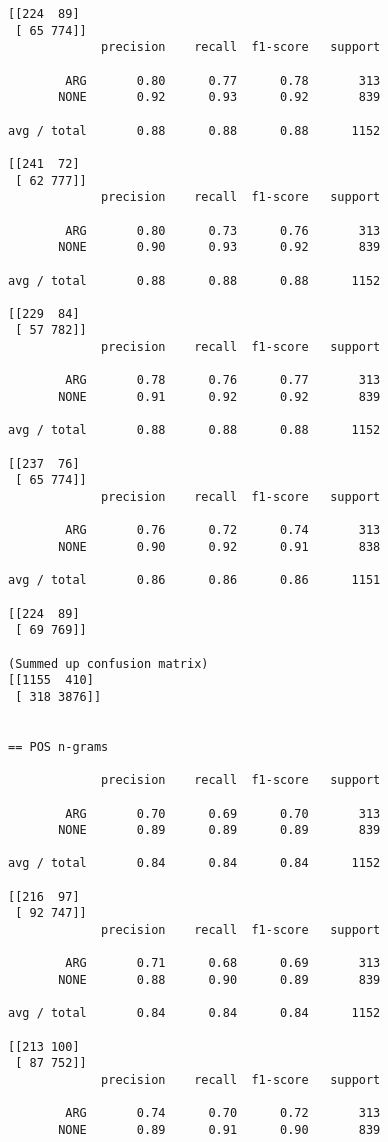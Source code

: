 \begin{appendices}
\begin{verbatim}
[[224  89]
 [ 65 774]]
             precision    recall  f1-score   support

        ARG       0.80      0.77      0.78       313
       NONE       0.92      0.93      0.92       839

avg / total       0.88      0.88      0.88      1152

[[241  72]
 [ 62 777]]
             precision    recall  f1-score   support

        ARG       0.80      0.73      0.76       313
       NONE       0.90      0.93      0.92       839

avg / total       0.88      0.88      0.88      1152

[[229  84]
 [ 57 782]]
             precision    recall  f1-score   support

        ARG       0.78      0.76      0.77       313
       NONE       0.91      0.92      0.92       839

avg / total       0.88      0.88      0.88      1152

[[237  76]
 [ 65 774]]
             precision    recall  f1-score   support

        ARG       0.76      0.72      0.74       313
       NONE       0.90      0.92      0.91       838

avg / total       0.86      0.86      0.86      1151

[[224  89]
 [ 69 769]]
 
(Summed up confusion matrix)
[[1155  410]
 [ 318 3876]]


== POS n-grams

             precision    recall  f1-score   support

        ARG       0.70      0.69      0.70       313
       NONE       0.89      0.89      0.89       839

avg / total       0.84      0.84      0.84      1152

[[216  97]
 [ 92 747]]
             precision    recall  f1-score   support

        ARG       0.71      0.68      0.69       313
       NONE       0.88      0.90      0.89       839

avg / total       0.84      0.84      0.84      1152

[[213 100]
 [ 87 752]]
             precision    recall  f1-score   support

        ARG       0.74      0.70      0.72       313
       NONE       0.89      0.91      0.90       839


\end{verbatim}
\end{appendices}

